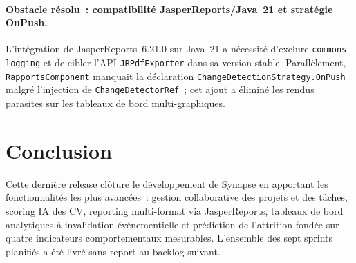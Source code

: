 \paragraph{Obstacle résolu~: compatibilité JasperReports/Java~21 et stratégie OnPush.}
L’intégration de JasperReports~6.21.0 sur Java~21 a nécessité d’exclure \texttt{commons-logging} et de cibler l’API \texttt{JRPdfExporter} dans sa version stable. Parallèlement, \texttt{RapportsComponent} manquait la déclaration \texttt{ChangeDetectionStrategy.OnPush} malgré l’injection de \texttt{ChangeDetectorRef}~; cet ajout a éliminé les rendus parasites sur les tableaux de bord multi-graphiques.

\section{Conclusion}

Cette dernière release clôture le développement de Synapse en apportant les
fonctionnalités les plus avancées~: gestion collaborative des projets et des tâches,
scoring IA des CV, reporting multi-format via JasperReports, tableaux de bord
analytiques à invalidation événementielle et prédiction de l’attrition fondée sur
quatre indicateurs comportementaux mesurables. L’ensemble des sept sprints planifiés
a été livré sans report au backlog suivant.

